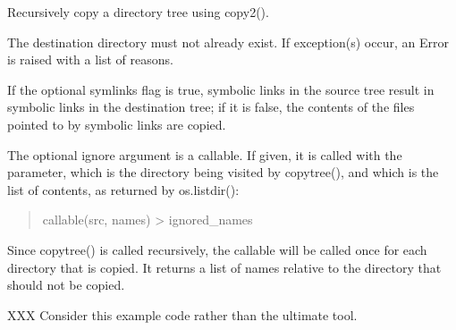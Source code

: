\documentclass[letterpaper,10pt,english]{sphinxmanual}
\begin{document}

\begin{fulllineitems}
\label{\detokenize{pygace:pygace.utility.copytree}}
\sphinxAtStartPar
Recursively copy a directory tree using copy2().

\sphinxAtStartPar
The destination directory must not already exist.
If exception(s) occur, an Error is raised with a list of reasons.

\sphinxAtStartPar
If the optional symlinks flag is true, symbolic links in the
source tree result in symbolic links in the destination tree; if
it is false, the contents of the files pointed to by symbolic
links are copied.

\sphinxAtStartPar
The optional ignore argument is a callable. If given, it
is called with the  parameter, which is the directory
being visited by copytree(), and  which is the list of
 contents, as returned by os.listdir():
\begin{quote}

\sphinxAtStartPar
callable(src, names) \sphinxhyphen{}\textgreater{} ignored\_names
\end{quote}

\sphinxAtStartPar
Since copytree() is called recursively, the callable will be
called once for each directory that is copied. It returns a
list of names relative to the  directory that should
not be copied.

\sphinxAtStartPar
XXX Consider this example code rather than the ultimate tool.

\end{fulllineitems}

\end{document}
